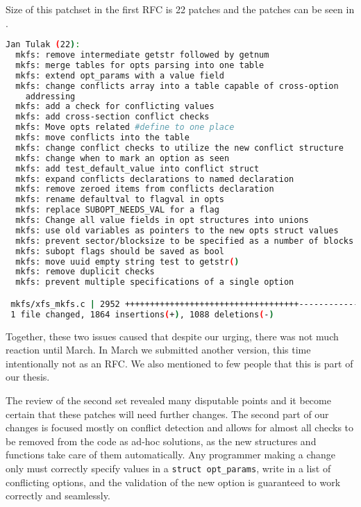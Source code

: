 Size of this patchset in the first RFC is 22 patches and the patches can be
seen in .
\begin{lstlisting}[frame=none, basicstyle=\footnotesize\ttfamily,
language=Bash, numbers=none, numberstyle=\tiny\color{black},caption= {Git
statistics for the second patchset~\cite{secondSetRFC}.},
label={lst:refactoring:secondSet}]
Jan Tulak (22):
  mkfs: remove intermediate getstr followed by getnum
  mkfs: merge tables for opts parsing into one table
  mkfs: extend opt_params with a value field
  mkfs: change conflicts array into a table capable of cross-option
    addressing
  mkfs: add a check for conflicting values
  mkfs: add cross-section conflict checks
  mkfs: Move opts related #define to one place
  mkfs: move conflicts into the table
  mkfs: change conflict checks to utilize the new conflict structure
  mkfs: change when to mark an option as seen
  mkfs: add test_default_value into conflict struct
  mkfs: expand conflicts declarations to named declaration
  mkfs: remove zeroed items from conflicts declaration
  mkfs: rename defaultval to flagval in opts
  mkfs: replace SUBOPT_NEEDS_VAL for a flag
  mkfs: Change all value fields in opt structures into unions
  mkfs: use old variables as pointers to the new opts struct values
  mkfs: prevent sector/blocksize to be specified as a number of blocks
  mkfs: subopt flags should be saved as bool
  mkfs: move uuid empty string test to getstr()
  mkfs: remove duplicit checks
  mkfs: prevent multiple specifications of a single option

 mkfs/xfs_mkfs.c | 2952 +++++++++++++++++++++++++++++++++++--------------------
 1 file changed, 1864 insertions(+), 1088 deletions(-)

\end{lstlisting}

Together, these two issues caused that despite our urging, there was not much
reaction until March. In March we submitted another version, this time
intentionally not as an RFC. We also mentioned to few people that this is
part of our thesis.

The review of the second set revealed many disputable points and it become
certain that these patches will need further changes. The second part of
our changes is focused mostly on conflict detection and allows for almost
all checks to be removed from the code as ad-hoc solutions, as the new
structures and functions take care of them automatically. Any programmer
making a change only must correctly specify values in a {\tt struct
opt\_params}, write in a list of conflicting options, and the validation of
the new option is guaranteed to work correctly and seamlessly.

